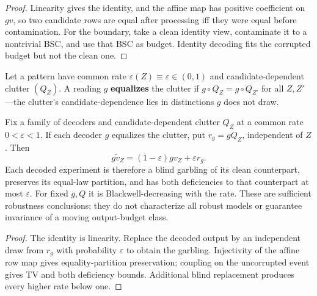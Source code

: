 \begin{proof}

Linearity gives the identity, and the affine map has positive coefficient on \(gv\), so two candidate rows are equal after processing iff they were equal before contamination. For the boundary, take a clean identity view, contaminate it to a nontrivial BSC, and use that BSC as budget. Identity decoding fits the corrupted budget but not the clean one.
\end{proof}

\begin{thmdef}

Let a pattern have common rate \(\varepsilon(Z) \equiv \varepsilon \in (0,1)\) and candidate-dependent clutter \((Q_Z)\). A reading \(g\) \textbf{equalizes} the clutter if \(g \circ Q_Z = g \circ Q_{Z'}\) for all \(Z, Z'\)---\hspace{0pt}the clutter's candidate-dependence lies in distinctions \(g\) does not draw.
\end{thmdef}

\begin{thmplain}

Fix a family of decoders and candidate-dependent clutter \(Q_Z\) at a common rate \(0<\varepsilon<1\). If each decoder \(g\) equalizes the clutter, put \(r_g=gQ_Z\), independent of \(Z\). Then
\[g\widetilde v_Z=(1-\varepsilon)gv_Z+\varepsilon r_g.\]
Each decoded experiment is therefore a blind garbling of its clean counterpart, preserves its equal-law partition, and has both deficiencies to that counterpart at most \(\varepsilon\). For fixed \(g,Q\) it is Blackwell-decreasing with the rate. These are sufficient robustness conclusions; they do not characterize all robust models or guarantee invariance of a moving output-budget class.
\end{thmplain}

\begin{proof}

The identity is linearity. Replace the decoded output by an independent draw from \(r_g\) with probability \(\varepsilon\) to obtain the garbling. Injectivity of the affine row map gives equality-partition preservation; coupling on the uncorrupted event gives TV and both deficiency bounds. Additional blind replacement produces every higher rate below one.
\end{proof}

